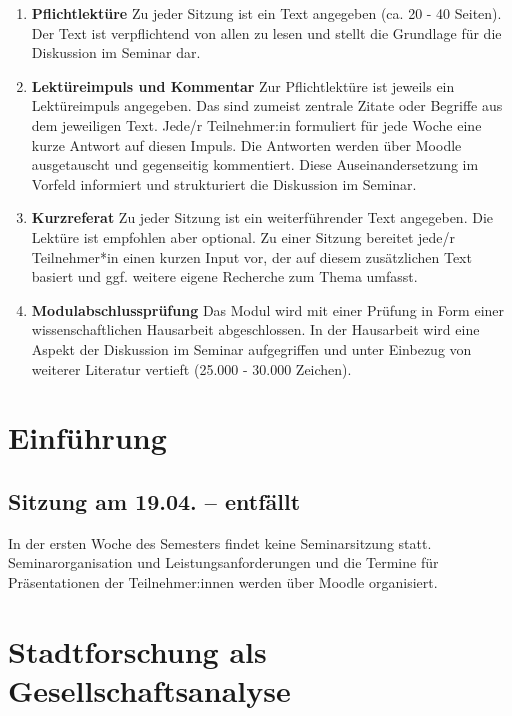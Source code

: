 \documentclass[
  ngerman,
]{article}
\begin{document}
\begin{enumerate}
\def\labelenumi{\arabic{enumi}.}
\item
  \textbf{Pflichtlektüre} Zu jeder Sitzung ist ein Text angegeben (ca. 20 - 40 Seiten). Der Text ist verpflichtend von allen zu lesen und stellt die Grundlage für die Diskussion im Seminar dar.
\item
  \textbf{Lektüreimpuls und Kommentar} Zur Pflichtlektüre ist jeweils ein Lektüreimpuls angegeben. Das sind zumeist zentrale Zitate oder Begriffe aus dem jeweiligen Text. Jede/r Teilnehmer:in formuliert für jede Woche eine kurze Antwort auf diesen Impuls. Die Antworten werden über Moodle ausgetauscht und gegenseitig kommentiert. Diese Auseinandersetzung im Vorfeld informiert und strukturiert die Diskussion im Seminar.
\item
  \textbf{Kurzreferat} Zu jeder Sitzung ist ein weiterführender Text angegeben. Die Lektüre ist empfohlen aber optional. Zu einer Sitzung bereitet jede/r Teilnehmer*in einen kurzen Input vor, der auf diesem zusätzlichen Text basiert und ggf. weitere eigene Recherche zum Thema umfasst.
\item
  \textbf{Modulabschlussprüfung} Das Modul wird mit einer Prüfung in Form einer wissenschaftlichen Hausarbeit abgeschlossen. In der Hausarbeit wird eine Aspekt der Diskussion im Seminar aufgegriffen und unter Einbezug von weiterer Literatur vertieft (25.000 - 30.000 Zeichen).
\end{enumerate}

\pagebreak

\hypertarget{einfuxfchrung}{%
\section{Einführung}\label{einfuxfchrung}}

\hypertarget{sitzung-am-19.04.-entfuxe4llt}{%
\subsection{Sitzung am 19.04. -- entfällt}\label{sitzung-am-19.04.-entfuxe4llt}}

In der ersten Woche des Semesters findet keine Seminarsitzung statt. Seminarorganisation und Leistungsanforderungen und die Termine für Präsentationen der Teilnehmer:innen werden über Moodle organisiert.

\hypertarget{stadtforschung-als-gesellschaftsanalyse}{%
\section{Stadtforschung als Gesellschaftsanalyse}\label{stadtforschung-als-gesellschaftsanalyse}}
\end{document}
